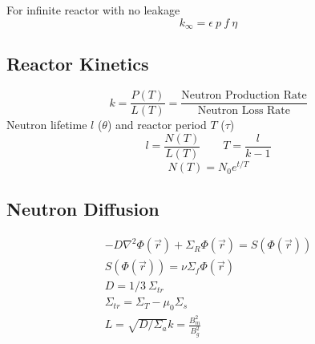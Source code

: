 For infinite reactor with no leakage
\[
k_\infty = \epsilon ~ p ~ f ~ \eta
\]

\subsection{Reactor Kinetics}
\[
k = \frac{P(T)}{L(T)} = \frac{\text{Neutron Production Rate}}{\text{Neutron Loss Rate}}
\]
Neutron lifetime $l$ ($\theta$) and reactor period $T$ ($\tau$)
\[
l = \frac{N(T)}{L(T)} \qquad T = \frac{l}{k-1}
\]
\[
N(T) = N_0 e^{t/T}
\]

\subsection{Neutron Diffusion}
\begin{gather*}
-D \nabla^2 \Phi(\vec{r}) + \Sigma_R \Phi(\vec{r}) = S(\Phi(\vec{r})) \\
S(\Phi(\vec{r})) = \nu \Sigma_f \Phi(\vec{r}) \\
D = 1 / 3 ~ \Sigma_{tr} \\
\Sigma_{tr} = \Sigma_T - \mu_0 \Sigma_s \\
L = \sqrt{D / \Sigma_a}
k = \frac{B_m^2}{B_g^2}
\end{gather*}